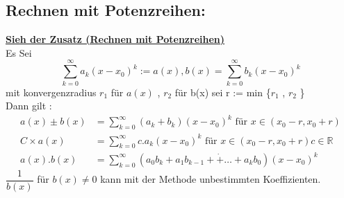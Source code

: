\subsection{Rechnen mit Potenzreihen: }
\textbf{\href{https://tu-dresden.de/mn/math/algebra/das-institut/beschaeftigte/antje-noack/ressourcen/dateien/v120-1/MathMethInf09Zusatz.pdf?lang=en}{Sieh der Zusatz (Rechnen mit Potenzreihen)}}\\
Es Sei \[ \sum_{k=0}^{\infty}{a_k(x - x_0)^k} := a(x) , b(x) =\sum_{k=0}^{\infty}{b_k(x-x_0)^k}\]
mit konvergenzradius $r_1$  für $a(x)$ , $r_2$ für b(x) sei r := min \{$r_1$ , $r_2$ \}\\
Dann gilt :
\begin{align*}
a(x) \pm b(x)&= \sum_{k=0}^{\infty}{(a_k + b_k)(x - x_0)^k}  \text{ für } x \in (x_0 - r , x_0 + r) \\
 C \times a(x) &= \sum_{k=0}^{\infty}{c.a_k(x-x_0)^k} \text{ für } x \in (x_0 -r , x_0+r) c \in \mathbb{R}\\
 a(x) . b(x) &= \sum_{k=0}^{\infty}{(a_0 b_k + a_1 b_{k-1}+ \dot + \dots +a_kb_0)(x- x_0)^k}
\end{align*}
$\dfrac{1}{b(x)}$  für  $b(x) \neq 0$  kann mit der Methode unbestimmten Koeffizienten. 